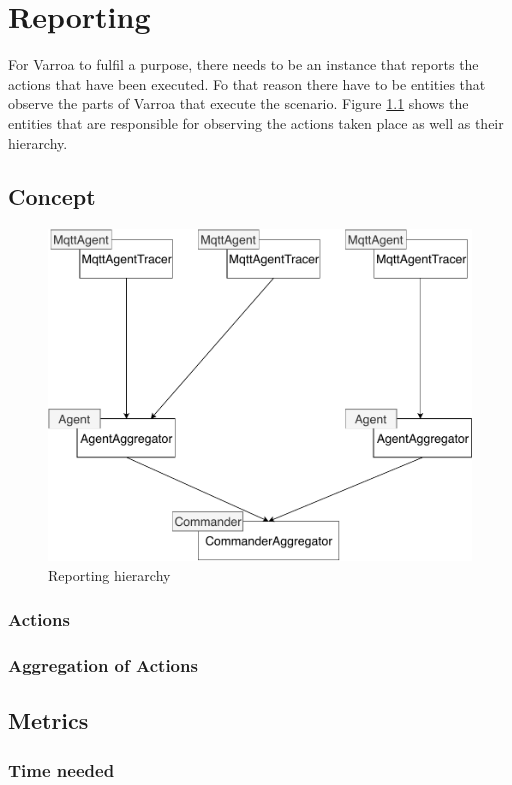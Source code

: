 \chapter{Reporting}
For Varroa to fulfil a purpose, there needs to be an instance that reports the actions that have been executed.
Fo that reason there have to be entities that observe the parts of Varroa that execute the scenario.
Figure \ref{fig:ReportMapping} shows the entities that are responsible for observing the actions taken place as well as their hierarchy.

\section{Concept}
\begin{figure}[H]
	\begin{center}
		\includegraphics[scale=0.8]{Resources/PDF/ReportMapping}
		\caption{Reporting hierarchy}
		\label{fig:ReportMapping}
	\end{center}
\end{figure}




\subsection{Actions}

\subsection{Aggregation of Actions}

\section{Metrics}

\subsection{Time needed}



